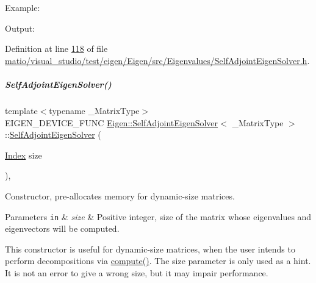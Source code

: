 Example\+: 
\begin{DoxyCodeInclude}
\end{DoxyCodeInclude}
 Output\+: 
\begin{DoxyVerbInclude}
\end{DoxyVerbInclude}
 

Definition at line \hyperlink{matio_2visual__studio_2test_2eigen_2_eigen_2src_2_eigenvalues_2_self_adjoint_eigen_solver_8h_source_l00118}{118} of file \hyperlink{matio_2visual__studio_2test_2eigen_2_eigen_2src_2_eigenvalues_2_self_adjoint_eigen_solver_8h_source}{matio/visual\+\_\+studio/test/eigen/\+Eigen/src/\+Eigenvalues/\+Self\+Adjoint\+Eigen\+Solver.\+h}.

\mbox{\label{group___eigenvalues___module_af20f466a4c29477271e91841e3382b27}} 
\subparagraph{\texorpdfstring{Self\+Adjoint\+Eigen\+Solver()}{SelfAdjointEigenSolver()}\hspace{0.1cm}{\footnotesize\ttfamily [5/6]}}
{\footnotesize\ttfamily template$<$typename \+\_\+\+Matrix\+Type$>$ \\
E\+I\+G\+E\+N\+\_\+\+D\+E\+V\+I\+C\+E\+\_\+\+F\+U\+NC \hyperlink{group___eigenvalues___module_class_eigen_1_1_self_adjoint_eigen_solver}{Eigen\+::\+Self\+Adjoint\+Eigen\+Solver}$<$ \+\_\+\+Matrix\+Type $>$\+::\hyperlink{group___eigenvalues___module_class_eigen_1_1_self_adjoint_eigen_solver}{Self\+Adjoint\+Eigen\+Solver} (\begin{DoxyParamCaption}\item[{\hyperlink{group___eigenvalues___module_a8a59ab7734b6eae2754fd78bc7c3a360}{Index}}]{size }\end{DoxyParamCaption})\hspace{0.3cm}{\ttfamily [inline]}, {\ttfamily [explicit]}}



Constructor, pre-\/allocates memory for dynamic-\/size matrices. 


\begin{DoxyParams}[1]{Parameters}
\mbox{\tt in}  & {\em size} & Positive integer, size of the matrix whose eigenvalues and eigenvectors will be computed.\\
\hline
\end{DoxyParams}
This constructor is useful for dynamic-\/size matrices, when the user intends to perform decompositions via \hyperlink{group___eigenvalues___module_a88bcdc24112efa7c4d2ebb3476efcbe9}{compute()}. The {\ttfamily size} parameter is only used as a hint. It is not an error to give a wrong {\ttfamily size}, but it may impair performance.

